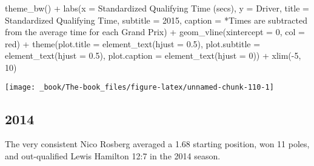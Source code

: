 \documentclass[
]{book}
\newenvironment{Shaded}{\begin{snugshade}}{\end{snugshade}}
\newcommand{\AttributeTok}[1]{\textcolor[rgb]{0.77,0.63,0.00}{#1}}
\newcommand{\DecValTok}[1]{\textcolor[rgb]{0.00,0.00,0.81}{#1}}
\newcommand{\FloatTok}[1]{\textcolor[rgb]{0.00,0.00,0.81}{#1}}
\newcommand{\FunctionTok}[1]{\textcolor[rgb]{0.00,0.00,0.00}{#1}}
\newcommand{\NormalTok}[1]{#1}
\newcommand{\SpecialCharTok}[1]{\textcolor[rgb]{0.00,0.00,0.00}{#1}}
\newcommand{\StringTok}[1]{\textcolor[rgb]{0.31,0.60,0.02}{#1}}
\begin{document}
\begin{Shaded}
\begin{Highlighting}[]
  \FunctionTok{theme\_bw}\NormalTok{() }\SpecialCharTok{+}
  \FunctionTok{labs}\NormalTok{(}\AttributeTok{x =} \StringTok{\textquotesingle{}Standardized Qualifying Time (secs)\textquotesingle{}}\NormalTok{,}
       \AttributeTok{y =} \StringTok{\textquotesingle{}Driver\textquotesingle{}}\NormalTok{,}
       \AttributeTok{title =} \StringTok{\textquotesingle{}Standardized Qualifying Time\textquotesingle{}}\NormalTok{,}
       \AttributeTok{subtitle =} \StringTok{\textquotesingle{}2015\textquotesingle{}}\NormalTok{,}
       \AttributeTok{caption =} \StringTok{\textquotesingle{}*Times are subtracted from the average time for each Grand Prix\textquotesingle{}}\NormalTok{) }\SpecialCharTok{+}
  \FunctionTok{geom\_vline}\NormalTok{(}\AttributeTok{xintercept =} \DecValTok{0}\NormalTok{, }\AttributeTok{col =} \StringTok{\textquotesingle{}red\textquotesingle{}}\NormalTok{) }\SpecialCharTok{+}
  \FunctionTok{theme}\NormalTok{(}\AttributeTok{plot.title =} \FunctionTok{element\_text}\NormalTok{(}\AttributeTok{hjust =} \FloatTok{0.5}\NormalTok{),}
        \AttributeTok{plot.subtitle =} \FunctionTok{element\_text}\NormalTok{(}\AttributeTok{hjust =} \FloatTok{0.5}\NormalTok{),}
        \AttributeTok{plot.caption =} \FunctionTok{element\_text}\NormalTok{(}\AttributeTok{hjust =} \DecValTok{0}\NormalTok{)) }\SpecialCharTok{+}
  \FunctionTok{xlim}\NormalTok{(}\SpecialCharTok{{-}}\DecValTok{5}\NormalTok{, }\DecValTok{10}\NormalTok{)}
\end{Highlighting}
\end{Shaded}

\begin{center}\texttt{[image: \_book/The-book\_files/figure-latex/unnamed-chunk-110-1]} \end{center}

\hypertarget{section-9}{%
\subsection{2014}\label{section-9}}

The very consistent Nico Rosberg averaged a 1.68 starting position, won 11 poles, and out-qualified Lewis Hamilton 12:7 in the 2014 season.
\end{document}

